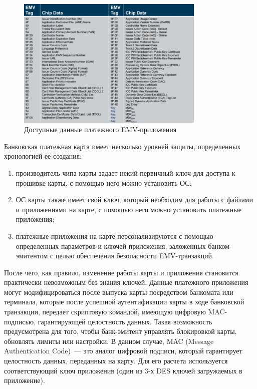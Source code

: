 \begin{figure}[H]
    \centering
    \includegraphics[width=0.8\textwidth]{images/research/emv_available_data}
    \caption{\centering Доступные данные платежного EMV-приложения}
    \label{fig:emv_available_data}
\end{figure}

Банковская платежная карта имеет несколько уровней защиты, определенных хронологией ее создания:

\begin{enumerate}
    \item производитель чипа карты задает некий первичный ключ для доступа к прошивке карты, с помощью него можно установить ОС;
    \item ОС карты также имеет свой ключ, который необходим для работы с файлами и приложениями на карте, с помощью него можно установить платежные приложения;
    \item платежные приложения на карте персонализируются с помощью определенных параметров и ключей приложения, заложенных банком-эмитентом с целью обеспечения безопасности EMV-транзакций.
\end{enumerate}

После чего, как правило, изменение работы карты и приложения становится практически невозможным без знания ключей.
Данные платежного приложения могут модифицироваться после выпуска карты посредством банкомата или терминала, которые после успешной аутентификации карты в ходе банковской транзакции, передает скриптовую командой, имеющую цифровую MAC-подписью, гарантирующей целостность данных.
Такая возможность предусмотрена для того, чтобы  банк-эмитент управлять блокировкой карты, обновлять лимиты или настройки.
В данном случае, MAC (Message Authentication Code)~--- это аналог цифровой подписи, который гарантирует целостность данных, переданных на карту.
Для его расчета используется соответствующий ключ приложения (один из 3-х DES ключей загружаемых в приложение).

